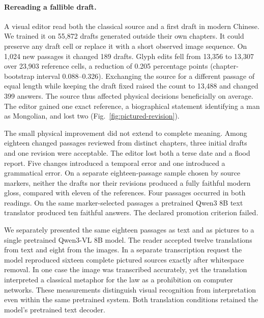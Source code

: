 \documentclass[12pt,a4paper]{article}
\providecommand{\DIFadd}[1]{{\protect\color{blue} \sf #1}} %
\begin{document}
\paragraph{\DIFadd{Rereading a fallible draft.}}
\DIFadd{A visual editor read both the classical source and a first draft in modern Chinese. We trained it on 55,872 drafts generated outside their own chapters. It could preserve any draft cell or replace it with a short observed image sequence. On 1,024 new passages it changed 189 drafts. Glyph edits fell from 13,356 to 13,307 over 23,903 reference cells, a reduction of 0.205 percentage points (chapter-bootstrap interval 0.088--0.326). Exchanging the source for a different passage of equal length while keeping the draft fixed raised the count to 13,488 and changed 399 answers. The source thus affected physical decisions beneficially on average. The editor gained one exact reference, a biographical statement identifying a man as Mongolian, and lost two (Fig.~\ref{fig:pictured-revision}).
}

\DIFadd{The small physical improvement did not extend to complete meaning. Among eighteen changed passages reviewed from distinct chapters, three initial drafts and one revision were acceptable. The editor lost both a terse date and a flood report. Five changes introduced a temporal error and one introduced a grammatical error. On a separate eighteen-passage sample chosen by source markers, neither the drafts nor their revisions produced a fully faithful modern gloss, compared with eleven of the references. Four passages occurred in both readings. On the same marker-selected passages a pretrained Qwen3 8B text translator produced ten faithful answers. The declared promotion criterion failed.
}

\DIFadd{We separately presented the same eighteen passages as text and as pictures to a single pretrained Qwen3-VL 8B model. The reader accepted twelve translations from text and eight from the images. In a separate transcription request the model reproduced sixteen complete pictured sources exactly after whitespace removal. In one case the image was transcribed accurately, yet the translation interpreted a classical metaphor for the law as a prohibition on computer networks. These measurements distinguish visual recognition from interpretation even within the same pretrained system. Both translation conditions retained the model's pretrained text decoder.
}
\end{document}
